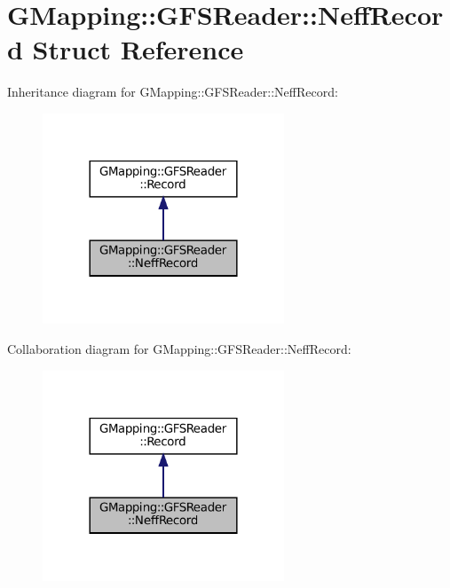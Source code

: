 \hypertarget{structGMapping_1_1GFSReader_1_1NeffRecord}{}\section{G\+Mapping\+:\+:G\+F\+S\+Reader\+:\+:Neff\+Record Struct Reference}
\label{structGMapping_1_1GFSReader_1_1NeffRecord}


Inheritance diagram for G\+Mapping\+:\+:G\+F\+S\+Reader\+:\+:Neff\+Record\+:
\nopagebreak
\begin{figure}[H]
\begin{center}
\leavevmode
\includegraphics[width=204pt]{structGMapping_1_1GFSReader_1_1NeffRecord__inherit__graph}
\end{center}
\end{figure}


Collaboration diagram for G\+Mapping\+:\+:G\+F\+S\+Reader\+:\+:Neff\+Record\+:
\nopagebreak
\begin{figure}[H]
\begin{center}
\leavevmode
\includegraphics[width=204pt]{structGMapping_1_1GFSReader_1_1NeffRecord__coll__graph}
\end{center}
\end{figure}
